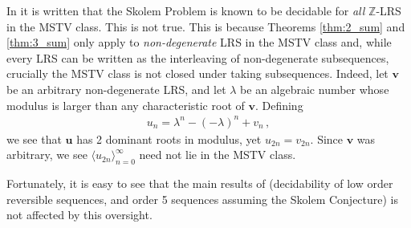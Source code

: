 \documentclass{article}\usepackage[a4paper,margin=20mm]{geometry}
\newcommand{\Z}{\mathbb{Z}}
\newcommand{\LRS}[1]{{\bm{#1}}}
\begin{document}
In \cite{Lipton_2022} it is written that the Skolem Problem is known to be decidable for \emph{all} $\Z$-LRS in the MSTV class. This is not true. This is because Theorems \ref{thm:2_sum} and \ref{thm:3_sum} only apply to \emph{non-degenerate} LRS in the MSTV class and, while every LRS can be written as the interleaving of non-degenerate subsequences, crucially the MSTV class is not closed under taking subsequences. Indeed, let $\LRS{v}$ be an arbitrary non-degenerate LRS, and let $\lambda$ be an algebraic number whose modulus is larger than any characteristic root of $\LRS{v}$. Defining 
\begin{align*}
    u_n = \lambda^n - (-\lambda)^n + v_n \, ,
\end{align*}
we see that $\LRS{u}$ has 2 dominant roots in modulus, yet $u_{2n} = v_{2n}$. Since $\LRS{v}$ was arbitrary, we see $\langle u_{2n} \rangle_{n=0}^\infty$ need not lie in the MSTV class.

Fortunately, it is easy to see that the main results of \cite{Lipton_2022} (decidability of low order reversible sequences, and order 5 sequences assuming the Skolem Conjecture) is not affected by this oversight.
\end{document}
